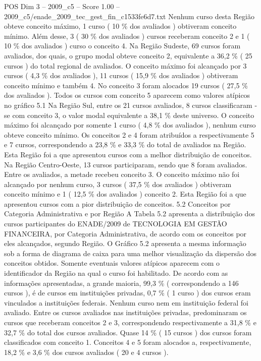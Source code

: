 \begin{textsample}{POS Dim 3 – 2009\_c5 – Score 1.00 – 2009\_c5/enade\_2009\_tec\_gest\_fin\_c1533fe6d7.txt}
Nenhum curso desta Região obteve conceito máximo, 1 curso ( 10 \% dos avaliados ) obtiveram conceito mínimo.
Além desse, 3 ( 30 \% dos avaliados ) cursos receberam conceito 2 e 1 ( 10 \% dos avaliados ) curso o conceito 4.
Na Região Sudeste, 69 cursos foram avaliados, dos quais, o grupo modal obteve conceito 2, equivalente a 36,2 \% ( 25 cursos ) do total regional de avaliados.
O conceito máximo foi alcançado por 3 cursos ( 4,3 \% dos avaliados ), 11 cursos ( 15,9 \% dos avaliados ) obtiveram conceito mínimo e também 4.
No conceito 3 foram alocados 19 cursos ( 27,5 \% dos avaliados ).
Todos os cursos com conceito 5 aparecem como valores atípicos no gráfico 5.1 Na Região Sul, entre os 21 cursos avaliados, 8 cursos classificaram -se com conceito 3, o valor modal equivalente a 38,1 \% deste universo.
O conceito máximo foi alcançado por somente 1 curso ( 4,8 \% dos avaliados ), nenhum curso obteve conceito mínimo.
Os conceitos 2 e 4 foram atribuídos a respectivamente 5 e 7 cursos, correspondendo a 23,8 \% e 33,3 \% do total de avaliados na Região.
Esta Região foi a que apresentou cursos com a melhor distribuição de conceitos.
Na Região Centro-Oeste, 13 cursos participaram, sendo que 8 foram avaliados.
Entre os avaliados, a metade recebeu conceito 3.
O conceito máximo não foi alcançado por nenhum curso, 3 cursos ( 37,5 \% dos avaliados ) obtiveram conceito mínimo e 1 ( 12,5 \% dos avaliados ) conceito 2.
Esta Região foi a que apresentou cursos com a pior distribuição de conceitos. 5.2 Conceitos por Categoria Administrativa e por Região A Tabela 5.2 apresenta a distribuição dos cursos participantes do ENADE/2009 de TECNOLOGIA EM GESTÃO FINANCEIRA, por Categoria Administrativa, de acordo com os conceitos por eles alcançados, segundo Região.
O Gráfico 5.2 apresenta a mesma informação sob a forma de diagrama de caixa para uma melhor visualização da dispersão dos conceitos obtidos.
Somente eventuais valores atípicos aparecem com o identificador da Região na qual o curso foi habilitado.
De acordo com as informações apresentadas, a grande maioria, 99,3 \% ( correspondendo a 146 cursos ), é de cursos em instituições privadas, 0,7 \% ( 1 curso ) dos cursos eram vinculados a instituições federais.
Nenhum curso nem em instituição federal foi avaliado.
Entre os cursos avaliados nas instituições privadas, predominaram os cursos que receberam conceitos 2 e 3, correspondendo respectivamente a 31,8 \% e 32,7 \% do total dos cursos avaliados.
Quase 14 \% ( 15 cursos ) dos cursos foram classificados com conceito 1.
Conceitos 4 e 5 foram alocados a, respectivamente, 18,2 \% e 3,6 \% dos cursos avaliados ( 20 e 4 cursos ).

\end{textsample}
